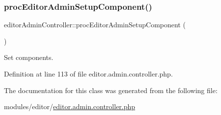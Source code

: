 \hypertarget{classeditorAdminController_a42b74f6454a6b5f75a2029c13452e0b8}{}\label{classeditorAdminController_a42b74f6454a6b5f75a2029c13452e0b8} 
\subsubsection{\texorpdfstring{proc\+Editor\+Admin\+Setup\+Component()}{procEditorAdminSetupComponent()}}
{\footnotesize\ttfamily editor\+Admin\+Controller\+::proc\+Editor\+Admin\+Setup\+Component (\begin{DoxyParamCaption}{ }\end{DoxyParamCaption})}



Set components. 



Definition at line 113 of file editor.\+admin.\+controller.\+php.



The documentation for this class was generated from the following file\+:\begin{DoxyCompactItemize}
\item 
modules/editor/\hyperlink{editor_8admin_8controller_8php}{editor.\+admin.\+controller.\+php}\end{DoxyCompactItemize}
